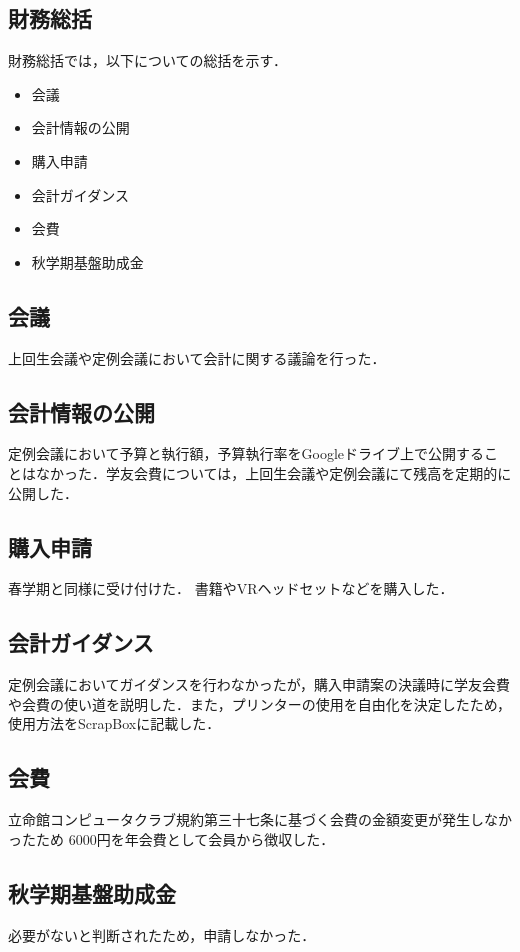 \subsection*{財務総括}


財務総括では，以下についての総括を示す．
\begin{itemize}
  \item 会議
  \item 会計情報の公開
  \item 購入申請
  \item 会計ガイダンス
  \item 会費
  \item 秋学期基盤助成金
\end{itemize}

\subsection*{会議}
上回生会議や定例会議において会計に関する議論を行った．

\subsection*{会計情報の公開}
定例会議において予算と執行額，予算執行率をGoogleドライブ上で公開することはなかった．学友会費については，上回生会議や定例会議にて残高を定期的に公開した．

\subsection*{購入申請}
春学期と同様に受け付けた．
書籍やVRヘッドセットなどを購入した．

\subsection*{会計ガイダンス}
定例会議においてガイダンスを行わなかったが，購入申請案の決議時に学友会費や会費の使い道を説明した．また，プリンターの使用を自由化を決定したため，使用方法をScrapBoxに記載した．

\subsection*{会費}
立命館コンピュータクラブ規約第三十七条に基づく会費の金額変更が発生しなかったため
6000円を年会費として会員から徴収した．

\subsection*{秋学期基盤助成金}
必要がないと判断されたため，申請しなかった．

